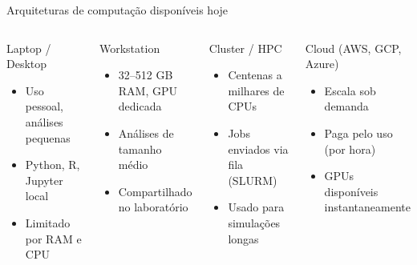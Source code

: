 \begin{frame}{Arquiteturas de computação disponíveis hoje}
\begin{columns}
\begin{block}{Laptop / Desktop}
\begin{itemize}
    \item Uso pessoal, análises pequenas
    \item Python, R, Jupyter local
    \item Limitado por RAM e CPU
\end{itemize}
\end{block}
\vspace{0.4cm}
\begin{block}{Workstation}
\begin{itemize}
    \item 32--512 GB RAM, GPU dedicada
    \item Análises de tamanho médio
    \item Compartilhado no laboratório
\end{itemize}
\end{block}

\begin{block}{Cluster / HPC}
\begin{itemize}
    \item Centenas a milhares de CPUs
    \item Jobs enviados via fila (SLURM)
    \item Usado para simulações longas
\end{itemize}
\end{block}
\vspace{0.4cm}
\begin{block}{Cloud (AWS, GCP, Azure)}
\begin{itemize}
    \item Escala sob demanda
    \item Paga pelo uso (por hora)
    \item GPUs disponíveis instantaneamente
\end{itemize}
\end{block}
\end{columns}
\end{frame}

